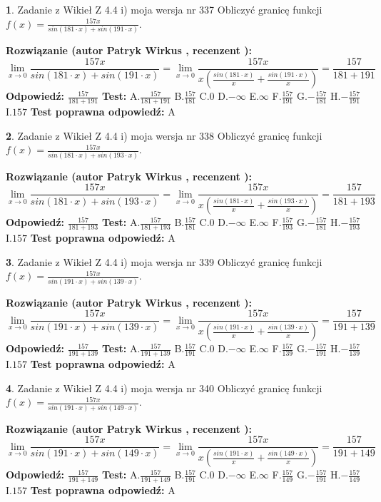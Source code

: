 \documentclass[12pt, a4paper]{article}
\theoremstyle{definition} %
\newtheorem{zad}{}
\newcommand{\zadStart}[1]{\begin{zad}#1\newline}
\newcommand{\zadStop}{\end{zad}}
\newcommand{\rozwStart}[2]{\noindent \textbf{Rozwiązanie (autor #1 , recenzent #2): }\newline}
\newcommand{\rozwStop}{\newline}
\newcommand{\odpStart}{\noindent \textbf{Odpowiedź:}\newline}
\newcommand{\odpStop}{\newline}
\newcommand{\testStart}{\noindent \textbf{Test:}\newline}
\newcommand{\testStop}{\newline}
\newcommand{\kluczStart}{\noindent \textbf{Test poprawna odpowiedź:}\newline}
\newcommand{\kluczStop}{\newline}
\begin{document}
\zadStart{Zadanie z Wikieł Z 4.4 i) moja wersja nr 337}
Obliczyć granicę funkcji $f(x)=\frac{157x}{sin(181\cdot x) +sin(191\cdot x)}$.
\zadStop
\rozwStart{Patryk Wirkus}{}
$$\lim\limits_{x\to 0}\frac{157x}{sin(181\cdot x) +sin(191\cdot x)}=\lim\limits_{x\to 0}\frac{157x}{x(\frac{sin(181\cdot x)}{x}+\frac{sin(191\cdot x)}{x})}=\frac{157}{181+191}$$
\rozwStop
\odpStart
$\frac{157}{181+191}$
\odpStop
\testStart
A.$\frac{157}{181+191}$
B.$\frac{157}{181}$
C.$0$
D.$-\infty$
E.$\infty$
F.$\frac{157}{191}$
G.$-\frac{157}{181}$
H.$-\frac{157}{191}$
I.$157$
\testStop
\kluczStart
A
\kluczStop



\zadStart{Zadanie z Wikieł Z 4.4 i) moja wersja nr 338}
Obliczyć granicę funkcji $f(x)=\frac{157x}{sin(181\cdot x) +sin(193\cdot x)}$.
\zadStop
\rozwStart{Patryk Wirkus}{}
$$\lim\limits_{x\to 0}\frac{157x}{sin(181\cdot x) +sin(193\cdot x)}=\lim\limits_{x\to 0}\frac{157x}{x(\frac{sin(181\cdot x)}{x}+\frac{sin(193\cdot x)}{x})}=\frac{157}{181+193}$$
\rozwStop
\odpStart
$\frac{157}{181+193}$
\odpStop
\testStart
A.$\frac{157}{181+193}$
B.$\frac{157}{181}$
C.$0$
D.$-\infty$
E.$\infty$
F.$\frac{157}{193}$
G.$-\frac{157}{181}$
H.$-\frac{157}{193}$
I.$157$
\testStop
\kluczStart
A
\kluczStop



\zadStart{Zadanie z Wikieł Z 4.4 i) moja wersja nr 339}
Obliczyć granicę funkcji $f(x)=\frac{157x}{sin(191\cdot x) +sin(139\cdot x)}$.
\zadStop
\rozwStart{Patryk Wirkus}{}
$$\lim\limits_{x\to 0}\frac{157x}{sin(191\cdot x) +sin(139\cdot x)}=\lim\limits_{x\to 0}\frac{157x}{x(\frac{sin(191\cdot x)}{x}+\frac{sin(139\cdot x)}{x})}=\frac{157}{191+139}$$
\rozwStop
\odpStart
$\frac{157}{191+139}$
\odpStop
\testStart
A.$\frac{157}{191+139}$
B.$\frac{157}{191}$
C.$0$
D.$-\infty$
E.$\infty$
F.$\frac{157}{139}$
G.$-\frac{157}{191}$
H.$-\frac{157}{139}$
I.$157$
\testStop
\kluczStart
A
\kluczStop



\zadStart{Zadanie z Wikieł Z 4.4 i) moja wersja nr 340}
Obliczyć granicę funkcji $f(x)=\frac{157x}{sin(191\cdot x) +sin(149\cdot x)}$.
\zadStop
\rozwStart{Patryk Wirkus}{}
$$\lim\limits_{x\to 0}\frac{157x}{sin(191\cdot x) +sin(149\cdot x)}=\lim\limits_{x\to 0}\frac{157x}{x(\frac{sin(191\cdot x)}{x}+\frac{sin(149\cdot x)}{x})}=\frac{157}{191+149}$$
\rozwStop
\odpStart
$\frac{157}{191+149}$
\odpStop
\testStart
A.$\frac{157}{191+149}$
B.$\frac{157}{191}$
C.$0$
D.$-\infty$
E.$\infty$
F.$\frac{157}{149}$
G.$-\frac{157}{191}$
H.$-\frac{157}{149}$
I.$157$
\testStop
\kluczStart
A
\kluczStop
\end{document}
